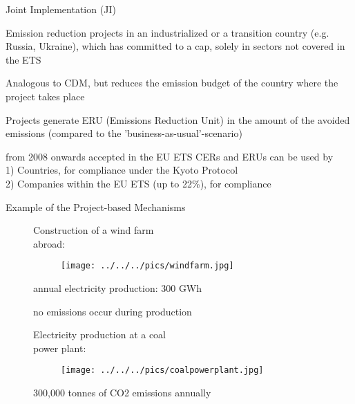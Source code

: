 
{Joint Implementation (JI)}
\item <1-> Emission reduction projects in an industrialized or a transition country (e.g. Russia, Ukraine), which has committed to a cap, solely in sectors not covered in the ETS
\item <2-> Analogous to CDM, but reduces the emission budget of the country where the project takes place
\item <3-> Projects generate ERU (Emissions Reduction Unit) in the amount of the avoided emissions (compared to the 'business-as-usual'-scenario)
\item <4-> from 2008 onwards accepted in the EU ETS
CERs and ERUs can be used by \\
1) Countries, for compliance under the Kyoto Protocol \\
2) Companies within the EU ETS (up to 22\%), for compliance


{Example of the Project-based Mechanisms}
\begin{figure}[t]
\begin{minipage}[t]{0.475\textwidth}
Construction of a wind farm \\
abroad:
\vspace*{-0.2cm}
\begin{figure}[h!]
\centering
\texttt{[image: ../../../pics/windfarm.jpg]}
\end{figure}
\vspace*{-0.4cm}
\item<1-> annual electricity production: 300 GWh
\item<1-> no emissions occur during production
\end{minipage}
\begin{minipage}[t]{0.475\textwidth}
Electricity production at a coal \\
power plant:
\vspace*{-0.2cm}
\begin{figure}[h!]
\centering
\texttt{[image: ../../../pics/coalpowerplant.jpg]}
\end{figure}
\vspace*{-0.4cm}
\item<1-> 300,000 tonnes of CO2 emissions annually
\end{minipage}
\end{figure}

